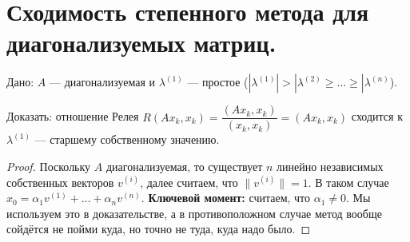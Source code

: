 \section{Сходимость степенного метода для диагонализуемых матриц.}

Дано: $A$ --- диагонализуемая и $\lambda^{(1)}$ --- простое ($|\lambda^{(1)}| >
    |\lambda^{(2)} \geq \dots \geq |\lambda^{(n)}$).

Доказать: отношение Релея $R(A x_k, x_k) = \dfrac{(A x_k, x_k)}{(x_k, x_k)}
    = (A x_k, x_k)$ сходится к $\lambda^{(1)}$ --- старшему собственному значению.

\begin{proof}
    Поскольку $A$ диагонализуемая, то существует $n$ линейно независимых собственных
    векторов $v^{(i)}$, далее считаем, что $\|v^{(i)}\| = 1$.
    В таком случае $x_0 = \alpha_1 v^{(1)} + \dots +
        \alpha_n v^{(n)}$. \textbf{Ключевой момент:} считаем, что $\alpha_1 \neq 0$. Мы используем
    это в доказательстве, а в противоположном случае метод вообще сойдётся не пойми
    куда, но точно не туда, куда надо было.


\end{proof}
